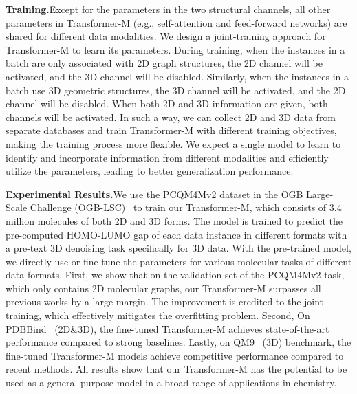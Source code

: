 \documentclass{article} \usepackage[dvipsnames]{xcolor}
\begin{document}
\textbf{Training.}\quad Except for the parameters in the two structural channels, all other parameters in Transformer-M (e.g., self-attention and feed-forward networks) are shared for different data modalities. We design a joint-training approach for Transformer-M to learn its parameters. During training, when the instances in a batch are only associated with 2D graph structures, the 2D channel will be activated, and the 3D channel will be disabled. Similarly, when the instances in a batch use 3D geometric structures, the 3D channel will be activated, and the 2D channel will be disabled. When both 2D and 3D information are given, both channels will be activated. In such a way, we can collect 2D and 3D data from separate databases and train Transformer-M with different training objectives, making the training process more flexible. We expect a single model to learn to identify and incorporate information from different modalities and efficiently utilize the parameters, leading to better generalization performance.

\textbf{Experimental Results.}\quad We use the PCQM4Mv2 dataset in the OGB Large-Scale Challenge (OGB-LSC)~\citep{hu2021ogb} to train our Transformer-M, which consists of 3.4 million molecules of both 2D and 3D forms. The model is trained to predict the pre-computed HOMO-LUMO gap of each data instance in different formats with a pre-text 3D denoising task specifically for 3D data. With the pre-trained model, we directly use or fine-tune the parameters for various molecular tasks of different data formats. First, we show that on the validation set of the PCQM4Mv2 task, which only contains 2D molecular graphs, our Transformer-M surpasses all previous works by a large margin. The improvement is credited to the joint training, which effectively mitigates the overfitting problem. Second, On PDBBind~\citep{wang2004pdbbind,wang2005pdbbind} (2D\&3D),  the fine-tuned Transformer-M achieves state-of-the-art performance compared to strong baselines. Lastly, on QM9~\citep{ramakrishnan2014quantum} (3D) benchmark, the fine-tuned Transformer-M models achieve competitive performance compared to recent methods. All results show that our Transformer-M has the potential to be used as a general-purpose model in a broad range of applications in chemistry.

\vspace{-8pt}
\end{document}
